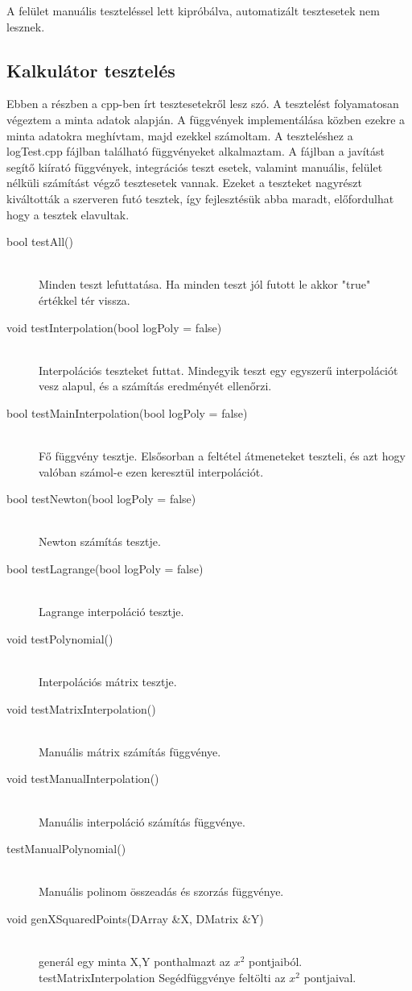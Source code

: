 	A felület manuális teszteléssel lett kipróbálva, automatizált tesztesetek nem lesznek.
\subsection{Kalkulátor tesztelés}
	Ebben a részben a cpp-ben írt tesztesetekről lesz szó. \newline
	A tesztelést folyamatosan végeztem a minta adatok alapján. A függvények implementálása közben ezekre a minta adatokra meghívtam, majd ezekkel számoltam. A teszteléshez a logTest.cpp fájlban található függvényeket alkalmaztam. \newline
	A fájlban a javítást segítő kiírató függvények, integrációs teszt esetek, valamint manuális, felület nélküli számítást végző tesztesetek vannak. \newline
	Ezeket a teszteket nagyrészt kiváltották a szerveren futó tesztek, így fejlesztésük abba maradt, előfordulhat hogy a tesztek elavultak.
	\begin{description}
		\item[bool testAll()] \hfill \\ 
			Minden teszt lefuttatása. Ha minden teszt jól futott le akkor "true" értékkel tér vissza.
		\item[void testInterpolation(bool logPoly = false)] \hfill \\ 
			Interpolációs teszteket futtat.
			Mindegyik teszt egy egyszerű interpolációt vesz alapul, és a számítás eredményét ellenőrzi.
		\item[bool testMainInterpolation(bool logPoly = false)] \hfill \\ 
			Fő függvény tesztje. Elsősorban a feltétel átmeneteket teszteli, és azt hogy valóban számol-e ezen keresztül interpolációt.
		\item[bool testNewton(bool logPoly = false)] \hfill \\ 
			Newton számítás tesztje.
		\item[bool testLagrange(bool logPoly = false)] \hfill \\ 
			Lagrange interpoláció tesztje.
		\item[void testPolynomial()] \hfill \\ 
			Interpolációs mátrix tesztje.
		\item[void testMatrixInterpolation()] \hfill \\ 
			Manuális mátrix számítás függvénye.
		\item[void testManualInterpolation()] \hfill \\ 
			Manuális interpoláció számítás függvénye.

		\item[testManualPolynomial()] \hfill \\ 
			Manuális polinom összeadás és szorzás függvénye. 
		\item[void genXSquaredPoints(DArray \&X, DMatrix \&Y)] \hfill \\ 
			generál egy minta X,Y ponthalmazt az $x^{2}$ 
			pontjaiból.
		testMatrixInterpolation Segédfüggvénye
		feltölti az $x^{2}$ pontjaival.
	\end{description}
